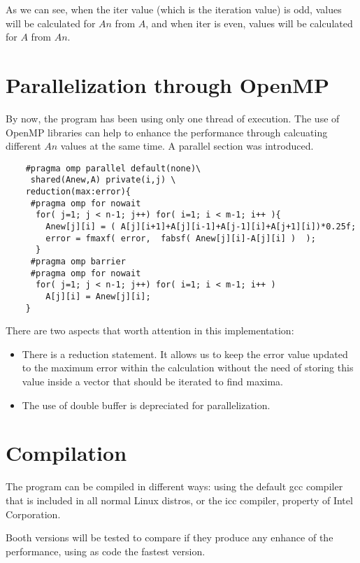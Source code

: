 \documentclass{article}
\begin{document}
	As we can see, when the iter value (which is the
	iteration value) is odd, values will be calculated for $An$ from $A$,
	and when iter is even, values will be calculated for $A$ from $An$.
	
\section {Parallelization through OpenMP}

	By now, the program has been using only one thread of execution. The
	use of OpenMP libraries can help to enhance the performance through
	calcuating different $An$ values at the same time. A parallel
	section was introduced.

	\begin{verbatim}
	#pragma omp parallel default(none)\
	 shared(Anew,A) private(i,j) \
	reduction(max:error){
	 #pragma omp for nowait
	  for( j=1; j < n-1; j++) for( i=1; i < m-1; i++ ){
	    Anew[j][i] = ( A[j][i+1]+A[j][i-1]+A[j-1][i]+A[j+1][i])*0.25f;
	    error = fmaxf( error,  fabsf( Anew[j][i]-A[j][i] )  );
	  }
	 #pragma omp barrier
	 #pragma omp for nowait
	  for( j=1; j < n-1; j++) for( i=1; i < m-1; i++ )
	    A[j][i] = Anew[j][i];
	}

	\end{verbatim}

	There are two aspects that worth attention in this implementation:

	\begin{itemize}
		\item There is a reduction statement. It allows us
		to keep the error value updated to the maximum
		error within the calculation without the need
		of storing this value inside a vector that
		should be iterated to find maxima.
		\item The use of double buffer is depreciated for
		parallelization.
	\end{itemize}

\section{Compilation}

	The program can be compiled in different ways: using the default
	gcc compiler that is included in all normal Linux distros,
	or the icc compiler, property of Intel Corporation.

	Booth versions will be tested to compare if
	they produce any enhance of the performance, using as code
	the fastest version.
\end{document}

